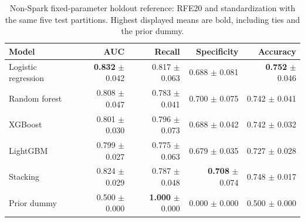 \begin{table}[H]
\centering\small
\caption{Non-Spark fixed-parameter holdout reference: RFE20 and standardization with the same five test partitions. Highest displayed means are bold, including ties and the prior dummy.}
\label{tab:holdout-fixed-test}
\begin{tabular}{lrrrr}
\toprule
Model & AUC & Recall & Specificity & Accuracy \\
\midrule
Logistic regression & \textbf{0.832} $\pm$ 0.042 & 0.817 $\pm$ 0.063 & 0.688 $\pm$ 0.081 & \textbf{0.752} $\pm$ 0.046 \\
Random forest & 0.808 $\pm$ 0.047 & 0.783 $\pm$ 0.041 & 0.700 $\pm$ 0.075 & 0.742 $\pm$ 0.041 \\
XGBoost & 0.801 $\pm$ 0.030 & 0.796 $\pm$ 0.073 & 0.688 $\pm$ 0.042 & 0.742 $\pm$ 0.032 \\
LightGBM & 0.799 $\pm$ 0.027 & 0.775 $\pm$ 0.063 & 0.679 $\pm$ 0.035 & 0.727 $\pm$ 0.028 \\
Stacking & 0.824 $\pm$ 0.029 & 0.787 $\pm$ 0.048 & \textbf{0.708} $\pm$ 0.074 & 0.748 $\pm$ 0.017 \\
Prior dummy & 0.500 $\pm$ 0.000 & \textbf{1.000} $\pm$ 0.000 & 0.000 $\pm$ 0.000 & 0.500 $\pm$ 0.000 \\
\bottomrule
\end{tabular}
\end{table}
